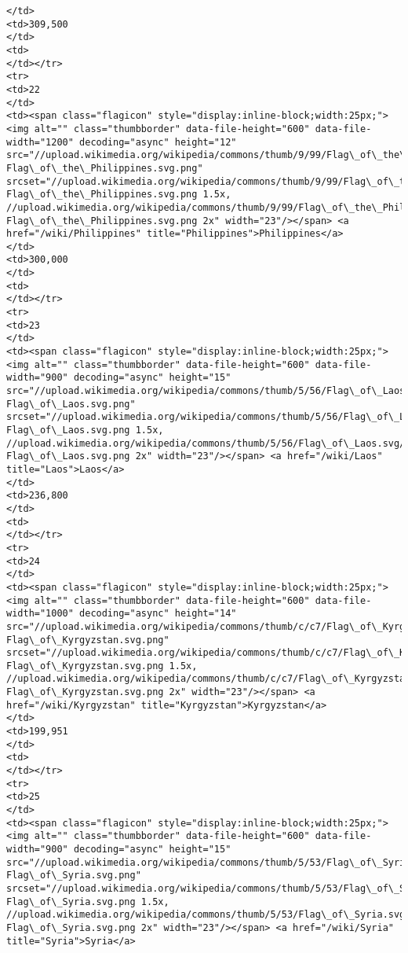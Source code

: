 \documentclass[11pt]{article}
\begin{document}
\begin{Verbatim}[commandchars=\\\{\}]
</td>
<td>309,500
</td>
<td>
</td></tr>
<tr>
<td>22
</td>
<td><span class="flagicon" style="display:inline-block;width:25px;"><img alt="" class="thumbborder" data-file-height="600" data-file-width="1200" decoding="async" height="12" src="//upload.wikimedia.org/wikipedia/commons/thumb/9/99/Flag\_of\_the\_Philippines.svg/23px-Flag\_of\_the\_Philippines.svg.png" srcset="//upload.wikimedia.org/wikipedia/commons/thumb/9/99/Flag\_of\_the\_Philippines.svg/35px-Flag\_of\_the\_Philippines.svg.png 1.5x, //upload.wikimedia.org/wikipedia/commons/thumb/9/99/Flag\_of\_the\_Philippines.svg/46px-Flag\_of\_the\_Philippines.svg.png 2x" width="23"/></span> <a href="/wiki/Philippines" title="Philippines">Philippines</a>
</td>
<td>300,000
</td>
<td>
</td></tr>
<tr>
<td>23
</td>
<td><span class="flagicon" style="display:inline-block;width:25px;"><img alt="" class="thumbborder" data-file-height="600" data-file-width="900" decoding="async" height="15" src="//upload.wikimedia.org/wikipedia/commons/thumb/5/56/Flag\_of\_Laos.svg/23px-Flag\_of\_Laos.svg.png" srcset="//upload.wikimedia.org/wikipedia/commons/thumb/5/56/Flag\_of\_Laos.svg/35px-Flag\_of\_Laos.svg.png 1.5x, //upload.wikimedia.org/wikipedia/commons/thumb/5/56/Flag\_of\_Laos.svg/45px-Flag\_of\_Laos.svg.png 2x" width="23"/></span> <a href="/wiki/Laos" title="Laos">Laos</a>
</td>
<td>236,800
</td>
<td>
</td></tr>
<tr>
<td>24
</td>
<td><span class="flagicon" style="display:inline-block;width:25px;"><img alt="" class="thumbborder" data-file-height="600" data-file-width="1000" decoding="async" height="14" src="//upload.wikimedia.org/wikipedia/commons/thumb/c/c7/Flag\_of\_Kyrgyzstan.svg/23px-Flag\_of\_Kyrgyzstan.svg.png" srcset="//upload.wikimedia.org/wikipedia/commons/thumb/c/c7/Flag\_of\_Kyrgyzstan.svg/35px-Flag\_of\_Kyrgyzstan.svg.png 1.5x, //upload.wikimedia.org/wikipedia/commons/thumb/c/c7/Flag\_of\_Kyrgyzstan.svg/46px-Flag\_of\_Kyrgyzstan.svg.png 2x" width="23"/></span> <a href="/wiki/Kyrgyzstan" title="Kyrgyzstan">Kyrgyzstan</a>
</td>
<td>199,951
</td>
<td>
</td></tr>
<tr>
<td>25
</td>
<td><span class="flagicon" style="display:inline-block;width:25px;"><img alt="" class="thumbborder" data-file-height="600" data-file-width="900" decoding="async" height="15" src="//upload.wikimedia.org/wikipedia/commons/thumb/5/53/Flag\_of\_Syria.svg/23px-Flag\_of\_Syria.svg.png" srcset="//upload.wikimedia.org/wikipedia/commons/thumb/5/53/Flag\_of\_Syria.svg/35px-Flag\_of\_Syria.svg.png 1.5x, //upload.wikimedia.org/wikipedia/commons/thumb/5/53/Flag\_of\_Syria.svg/45px-Flag\_of\_Syria.svg.png 2x" width="23"/></span> <a href="/wiki/Syria" title="Syria">Syria</a>

\end{Verbatim}
\end{document}
